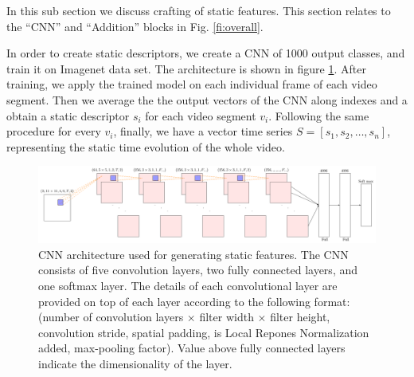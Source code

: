 In this sub section we discuss crafting of static features. This section relates to
the ``CNN'' and ``Addition'' blocks in Fig. \ref{fi:overall}.

In order to create static descriptors, we create a CNN of 1000 output classes, and train it on Imagenet data set. The architecture is shown in figure \ref{fi:cnn}.
After training, we apply the trained model on each individual frame of each video segment. Then we average the the output vectors of the CNN
along indexes and a obtain a static descriptor $s_{i}$ for each video segment $v_{i}$. Following the same
procedure for every $v_{i}$, finally, we have a vector time series
$S =[s_{1}, s_{2}, \dots, s_{n}]$, representing the static time evolution of the whole video.

\begin{figure}
  \centering
  \includegraphics[scale=0.5]{./figures/nw.pdf}
  \caption{CNN architecture used for generating static features. The CNN consists of five convolution layers,
  two fully connected layers, and one softmax layer. The details of each convolutional layer are provided on top of each layer
  according to the following format:(number of convolution layers $\times$ filter width $\times$ filter height, convolution stride,
  spatial padding, is Local Repones Normalization added, max-pooling factor). Value above fully connected layers indicate the dimensionality of the layer.}
\label{fi:cnn}
\end{figure} 
